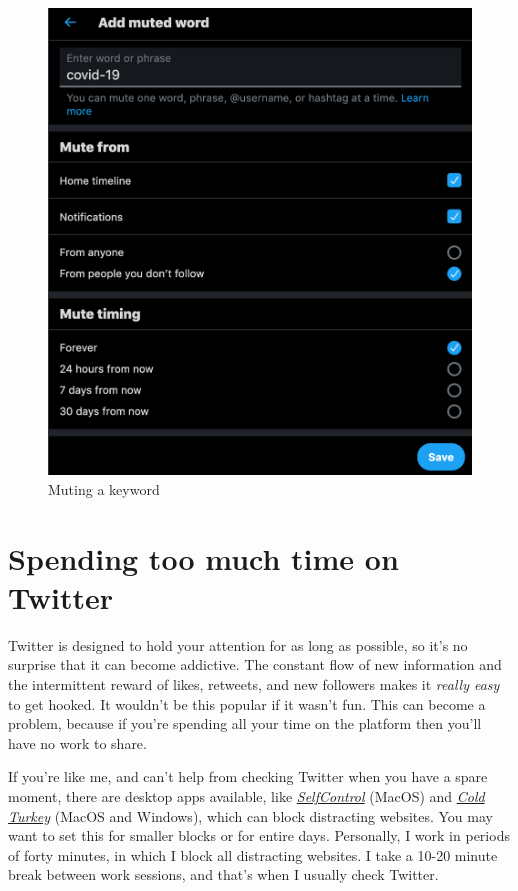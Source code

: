 \documentclass[]{book}
\begin{document}
\begin{figure}

{\centering \includegraphics[width=0.8\linewidth]{images/mute_word} 

}

\caption{Muting a keyword}\label{fig:mute-word}
\end{figure}

\hypertarget{spending-too-much-time-on-twitter}{%
\section{Spending too much time on Twitter}\label{spending-too-much-time-on-twitter}}

Twitter is designed to hold your attention for as long as possible, so it's no surprise that it can become addictive. The constant flow of new information and the intermittent reward of likes, retweets, and new followers makes it \emph{really easy} to get hooked. It wouldn't be this popular if it wasn't fun. This can become a problem, because if you're spending all your time on the platform then you'll have no work to share.

If you're like me, and can't help from checking Twitter when you have a spare moment, there are desktop apps available, like \href{https://selfcontrolapp.com/}{\emph{SelfControl}} (MacOS) and \href{https://getcoldturkey.com/}{\emph{Cold Turkey}} (MacOS and Windows), which can block distracting websites. You may want to set this for smaller blocks or for entire days. Personally, I work in periods of forty minutes, in which I block all distracting websites. I take a 10-20 minute break between work sessions, and that's when I usually check Twitter.
\end{document}
